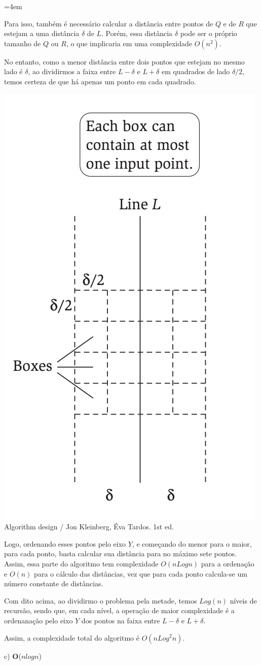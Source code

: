 \documentclass[10pt,a4paper]{letter}
\newenvironment{resposta}{%
  \par%
  \medskip
  \leftskip=4em%
  \noindent\ignorespaces}{%
  \par\medskip}
\begin{document}
\begin{resposta}
\begin{center}
\end{center}
Para isso, também é necessário calcular a distância entre pontos de $Q$ e de $R$ que estejam a uma distância $\delta$ de $L$. Porém, essa distância $\delta$ pode ser o próprio tamanho de $Q$ ou $R$, o que implicaria em uma complexidade $O(n^2)$.
\par 
No entanto, como a menor distância entre dois pontos que estejam no mesmo lado é $\delta$, ao dividirmos a faixa entre $L-\delta$ e $L+\delta$ em quadrados de lado $\delta/2$, temos certeza de que há apenas um ponto em cada quadrado.

\begin{center}
\par
\includegraphics[width=.3\textwidth]{boxes}\\
Algorithm design / Jon Kleinberg, Éva Tardos. 1st ed.
\end{center}

Logo, ordenando esses pontos pelo eixo $Y$, e começando do menor para o maior, para cada ponto, basta calcular sua distância para no máximo sete pontos. Assim, essa parte do algoritmo tem complexidade $O(nLogn)$ para a ordenação e $O(n)$ para o cálculo das distâncias, vez que para cada ponto calcula-se um número constante de distâncias.
\par 
Com dito acima, ao dividirmo o problema pela metade, temos $Log(n)$ níveis de recursão, sendo que, em cada nível, a operação de maior complexidade é a ordenanação pelo eixo $Y$ dos pontos na faixa entre $L-\delta$ e $L+\delta$.
\par 
Assim, a complexidade total do algoritmo é $O(nLog^2n)$.

\end{resposta}

\newpage
\par c) \textbf{O}($nlogn$)
\end{document}
